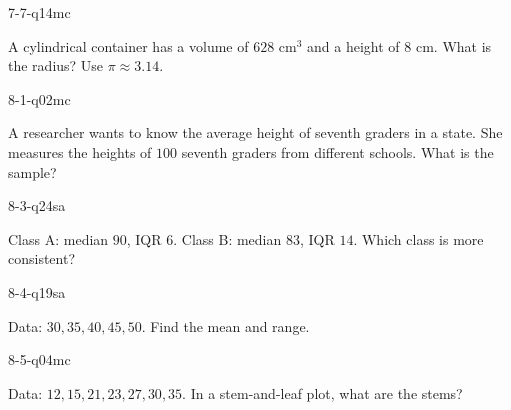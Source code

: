 \begin{practiceQuestion}{7-7-q14}{mc}
\begin{questionText}
A cylindrical container has a volume of $628$ cm$^3$ and a height of $8$ cm. What is the radius? Use $\pi \approx 3.14$.
\end{questionText}
\end{practiceQuestion}

\begin{practiceQuestion}{8-1-q02}{mc}
\begin{questionText}
A researcher wants to know the average height of seventh graders in a state. She measures the heights of $100$ seventh graders from different schools. What is the sample?
\end{questionText}
\end{practiceQuestion}

\begin{practiceQuestion}{8-3-q24}{sa}
\begin{questionText}
Class A: median $90$, IQR $6$. Class B: median $83$, IQR $14$. Which class is more consistent?
\end{questionText}
\end{practiceQuestion}

\begin{practiceQuestion}{8-4-q19}{sa}
\begin{questionText}
Data: $30, 35, 40, 45, 50$. Find the mean and range.
\end{questionText}
\end{practiceQuestion}

\begin{practiceQuestion}{8-5-q04}{mc}
\begin{questionText}
Data: $12, 15, 21, 23, 27, 30, 35$. In a stem-and-leaf plot, what are the stems?
\end{questionText}
\end{practiceQuestion}

